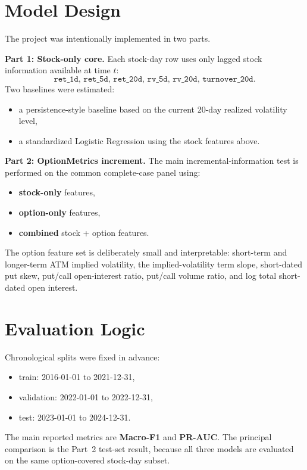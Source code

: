 \documentclass[10pt]{article}
\begin{document}
\section*{Model Design}
The project was intentionally implemented in two parts.

\textbf{Part 1: Stock-only core.} Each stock-day row uses only lagged stock information available at time $t$:
\[
\texttt{ret\_1d, ret\_5d, ret\_20d, rv\_5d, rv\_20d, turnover\_20d.}
\]
Two baselines were estimated:
\begin{itemize}
    \item a persistence-style baseline based on the current 20-day realized volatility level,
    \item a standardized Logistic Regression using the stock features above.
\end{itemize}

\textbf{Part 2: OptionMetrics increment.} The main incremental-information test is performed on the common complete-case panel using:
\begin{itemize}
    \item \textbf{stock-only} features,
    \item \textbf{option-only} features,
    \item \textbf{combined} stock + option features.
\end{itemize}
The option feature set is deliberately small and interpretable: short-term and longer-term ATM implied volatility, the implied-volatility term slope, short-dated put skew, put/call open-interest ratio, put/call volume ratio, and log total short-dated open interest.

\section*{Evaluation Logic}
Chronological splits were fixed in advance:
\begin{itemize}
    \item train: 2016-01-01 to 2021-12-31,
    \item validation: 2022-01-01 to 2022-12-31,
    \item test: 2023-01-01 to 2024-12-31.
\end{itemize}
The main reported metrics are \textbf{Macro-F1} and \textbf{PR-AUC}. The principal comparison is the Part~2 test-set result, because all three models are evaluated on the same option-covered stock-day subset.

\newpage
\end{document}
